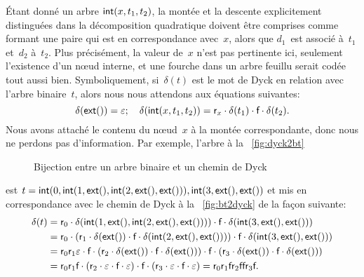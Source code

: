 Étant donné un arbre \(\textsf{int}(x,t_1,t_2)\), la montée et la
descente explicitement distinguées dans la décomposition quadratique
doivent être comprises comme formant une paire qui est en
correspondance avec~\(x\), alors que \(d_1\)~est associé à~\(t_1\)
et~\(d_2\) à~\(t_2\). Plus précisément, la valeur de~\(x\) n'est pas
pertinente ici, seulement l'existence d'un nœud interne, et une
fourche dans un arbre feuillu serait codée tout aussi
bien. Symboliquement, si~\(\delta(t)\) est le mot de Dyck en relation
avec l'arbre binaire~\(t\), alors nous nous attendons aux équations
suivantes:
\begin{equation}
\delta(\textsf{ext}()) = \varepsilon; \quad \delta(\textsf{int}(x,t_1,t_2))
= \textsf{r}_{x} \cdot \delta(t_1) \cdot \textsf{f} \cdot \delta(t_2).
\label{eq:delta}
\end{equation}
Nous avons attaché le contenu du nœud~\(x\) à la montée
correspondante, donc nous ne perdons pas d'information. Par exemple,
l'arbre à la \fig~\vref{fig:dyck2bt}
\begin{figure}[b]
\centering
{}
\qquad\quad
\subfloat[Chemin de Dyck correspondant au codage préfixe $[0,1,\Box,2,\Box,\Box,3,\Box,\Box\char93$\label{fig:bt2dyck}]{%
\texttt{[image: bt2dyck]}}
\caption{Bijection entre un arbre binaire et un chemin de Dyck}
\end{figure}
est \(t=\textsf{int}(0, \textsf{int}(1, \textsf{ext}(), \textsf{int}(2,
\textsf{ext}(), \textsf{ext}())), \textsf{int}(3, \textsf{ext}(), \textsf{ext}())\)
et mis en correspondance avec le chemin de Dyck à la
\fig~\vref{fig:bt2dyck} de la
façon suivante:
\begin{align*}
\delta(t)
&= \textsf{r}_0 \cdot \delta(\textsf{int}(1, \textsf{ext}(),
\textsf{int}(2, \textsf{ext}(), \textsf{ext}()))) \cdot \textsf{f} \cdot
\delta(\textsf{int}(3, \textsf{ext}(), \textsf{ext}()))\\ &= \textsf{r}_0
\cdot (\textsf{r}_1 \cdot \delta(\textsf{ext}()) \cdot \textsf{f} \cdot
\delta(\textsf{int}(2, \textsf{ext}(), \textsf{ext}()))) \cdot
\textsf{f} \cdot \delta(\textsf{int}(3, \textsf{ext}(), \textsf{ext}()))\\
&= \textsf{r}_0 \textsf{r}_1 \varepsilon \cdot \textsf{f} \cdot (\textsf{r}_2
\cdot \delta(\textsf{ext}()) \cdot \textsf{f} \cdot \delta(\textsf{ext}()))
\cdot \textsf{f} \cdot (\textsf{r}_3 \cdot \delta(\textsf{ext}()) \cdot \textsf{f}
\cdot \delta(\textsf{ext}()))\\
&= \textsf{r}_0 \textsf{r}_1 \textsf{f} \cdot (\textsf{r}_2 \cdot
\varepsilon \cdot \textsf{f} \cdot \varepsilon) \cdot
\textsf{f} \cdot (\textsf{r}_3 \cdot \varepsilon \cdot \textsf{f} \cdot
\varepsilon)
= \textsf{r}_0\textsf{r}_1\textsf{f}\textsf{r}_2\textsf{f}\textsf{f}\textsf{r}_3\textsf{f}.
\end{align*}
